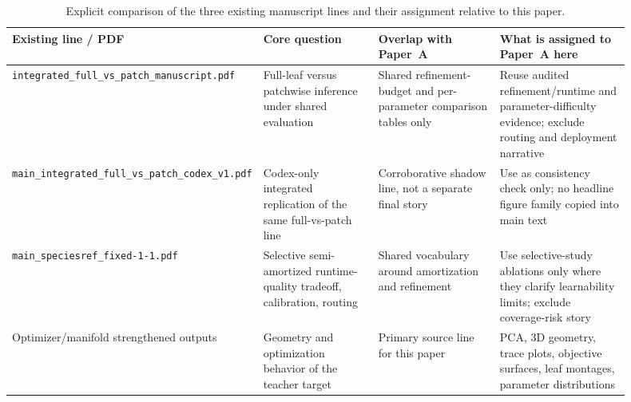 \documentclass[11pt,a4paper]{article}
\begin{document}
\begin{table}[H]
\centering
\caption{Explicit comparison of the three existing manuscript lines and their assignment relative to this paper.}
\label{tab:lineage}
\small
\begin{tabular}{p{0.22\linewidth}p{0.22\linewidth}p{0.23\linewidth}p{0.23\linewidth}}
\toprule
Existing line / PDF & Core question & Overlap with Paper~A & What is assigned to Paper~A here \\
\midrule
\texttt{integrated\_full\_vs\_patch\_manuscript.pdf} & Full-leaf versus patchwise inference under shared evaluation & Shared refinement-budget and per-parameter comparison tables only & Reuse audited refinement/runtime and parameter-difficulty evidence; exclude routing and deployment narrative \\
\texttt{main\_integrated\_full\_vs\_patch\_codex\_v1.pdf} & Codex-only integrated replication of the same full-vs-patch line & Corroborative shadow line, not a separate final story & Use as consistency check only; no headline figure family copied into main text \\
\texttt{main\_speciesref\_fixed-1-1.pdf} & Selective semi-amortized runtime-quality tradeoff, calibration, routing & Shared vocabulary around amortization and refinement & Use selective-study ablations only where they clarify learnability limits; exclude coverage-risk story \\
Optimizer/manifold strengthened outputs & Geometry and optimization behavior of the teacher target & Primary source line for this paper & PCA, 3D geometry, trace plots, objective surfaces, leaf montages, parameter distributions \\
\bottomrule
\end{tabular}
\end{table}
\end{document}
